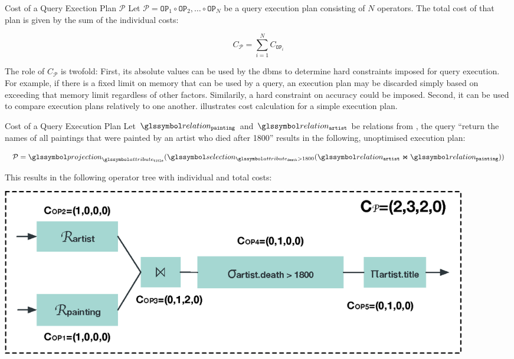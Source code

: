 \begin{definition}[label=definition:plan_cost]{Cost of a Query Exection Plan $\mathcal{P}$}{}
    Let $\mathcal{P} = \mathtt{OP}_1 \circ \mathtt{OP}_2, \ldots \circ \mathtt{OP}_N $ be a query execution plan consisting of $N$ operators. The total cost of that plan is given by the sum of the individual costs:

    \begin{equation*}
        C_{\mathcal{P}} = \sum_{i=1}^{N} C_{\mathtt{OP}_i}
    \end{equation*}
\end{definition}

The role of $C_{\mathcal{P}}$ is twofold: First, its absolute values can be used by the \acrshort{dbms} to determine hard constraints imposed for query execution. For example, if there is a fixed limit on memory that can be used by a query, an execution plan may be discarded simply based on exceeding that memory limit regardless of other factors. Similarily, a hard constraint on accuracy could be imposed. Second, it can be used to compare execution plans relatively to one another.  illustrates cost calculation for a simple execution plan.

\begin{example}[label=example:cost_model]{Cost of a Query Execution Plan}{}
    Let $\relation_{\mathtt{painting}}$ and $\relation_{\mathtt{artist}}$ be relations from , the query ``return the names of all paintings that were painted by an artist who died after 1800'' results in the following, unoptimised execution plan:

    \begin{equation*}
        \mathcal{P} = \projection_{\attribute_{\mathtt{title}}}(\selection_{\attribute_{\mathtt{death}} > 1800}(\relation_{\mathtt{artist}} \Join \relation_{\mathtt{painting}}))
    \end{equation*}

    This results in the following operator tree with individual and total costs:

    \begin{center}
        \includegraphics[width=0.9\textwidth]{figures/cost_example.eps}
    \end{center}
\end{example}

